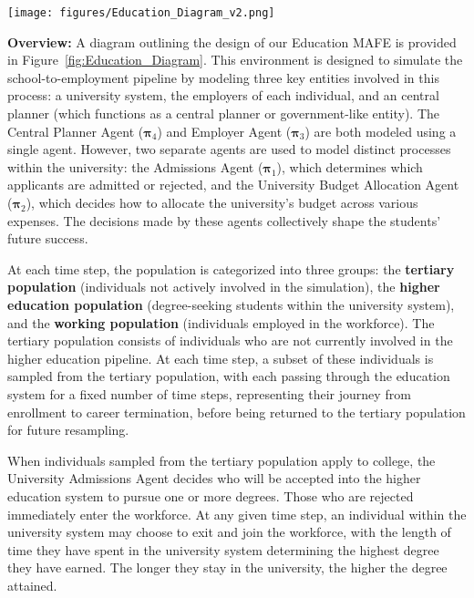 \label{sec::education_MAFE}

\begin{figure*}
    \centering
    \texttt{[image: figures/Education\_Diagram\_v2.png]}
    \caption{Education MAFE Diagram} 
    \label{fig:Education_Diagram}
    \vspace{-0mm}
\end{figure*}

\textbf{Overview:} A diagram outlining the design of our Education MAFE is provided in Figure~\ref{fig:Education_Diagram}. This environment is designed to simulate the school-to-employment pipeline by modeling three key entities involved in this process: a university system, the employers of each individual, and an central planner (which functions as a central planner or government-like entity). The Central Planner Agent ($\boldsymbol{\pi}_{4}$) and Employer Agent ($\boldsymbol{\pi}_{3}$) are both modeled using a single agent. However, two separate agents are used to model distinct processes within the university: the Admissions Agent ($\boldsymbol{\pi}_{1}$), which determines which applicants are admitted or rejected, and the University Budget Allocation Agent ($\boldsymbol{\pi}_{2}$), which decides how to allocate the university’s budget across various expenses. The decisions made by these agents collectively shape the students' future success.

At each time step, the population is categorized into three groups: the \textbf{tertiary population} (individuals not actively involved in the simulation), the \textbf{higher education population} (degree-seeking students within the university system), and the \textbf{working population} (individuals employed in the workforce). The tertiary population consists of individuals who are not currently involved in the higher education pipeline. At each time step, a subset of these individuals is sampled from the tertiary population, with each passing through the education system for a fixed number of time steps, representing their journey from enrollment to career termination, before being returned to the tertiary population for future resampling.

When individuals sampled from the tertiary population apply to college, the University Admissions Agent decides who will be accepted into the higher education system to pursue one or more degrees. Those who are rejected immediately enter the workforce. At any given time step, an individual within the university system may choose to exit and join the workforce, with the length of time they have spent in the university system determining the highest degree they have earned. The longer they stay in the university, the higher the degree attained.

